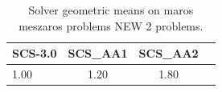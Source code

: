 \begin{table}
\centering
\caption{Solver geometric means on maros meszaros problems NEW 2 problems.}
\label{t-maros meszaros problems NEW 2-geom_mean}
\begin{tabular}{lccc}
\toprule
 SCS-3.0 &  SCS\_AA1 &  SCS\_AA2 \\
\midrule
    1.00 &     1.20 &     1.80 \\
\bottomrule
\end{tabular}
\end{table}
